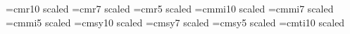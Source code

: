 
  

\noblackbox
\def\Title#1#2{\rightline{#1}\ifx\answ\bigans\nopagenumbers\pageno0\vskip1in
\else\pageno1\vskip.8in\fi \centerline{\titlefont #2}\vskip .5in}
\font\titlerm=cmr10 scaled \font\titlerms=cmr7 scaled
\font\titlermss=cmr5 scaled \font\titlei=cmmi10 scaled
\font\titleis=cmmi7 scaled \font\titleiss=cmmi5 scaled
\font\titlesy=cmsy10 scaled \font\titlesys=cmsy7 scaled
\font\titlesyss=cmsy5 scaled \font\titleit=cmti10 scaled
%
%
\ifx\epsfbox\UnDeFiNeD{}
\def\figin#1{\vskip2in}%
\else{}\def\figin#1{#1}%
\fi
\def\Fig#1{Fig.~\the\figno\xdef#1{Fig.~\the\figno}\global\advance\figno
 by1}
%
%
%
%
\def\ifig#1#2#3#4{
\goodbreak\midinsert
\figin{\centerline{\epsfysize=#4truein\epsfbox{#3}}}
\narrower\narrower\noindent{\footnotefont
{\bf #1:}  #2\par}
\endinsert
}
